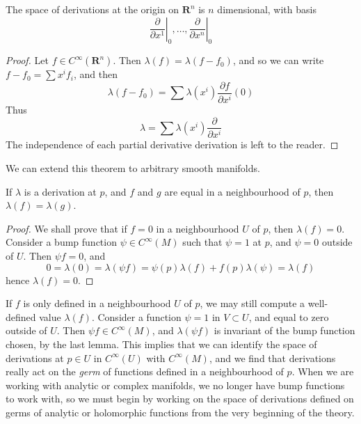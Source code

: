 \begin{theorem}
    The space of derivations at the origin on $\mathbf{R}^n$ is $n$ dimensional, with basis
    \[ \left.\frac{\partial}{\partial x^1}\right|_0, \dots, \left.\frac{\partial}{\partial x^n}\right|_0 \]
\end{theorem}
\begin{proof}
    Let $f \in C^\infty(\mathbf{R}^n)$. Then $\lambda(f) = \lambda(f - f_0)$, and so we can write $f - f_0 = \sum x^i f_i$, and then
    \[ \lambda(f - f_0) = \sum \lambda(x^i) \frac{\partial f}{\partial x^i}(0) \]
    Thus
    \[ \lambda = \sum \lambda(x^i) \frac{\partial}{\partial x^i} \]
    The independence of each partial derivative derivation is left to the reader.
\end{proof}

We can extend this theorem to arbitrary smooth manifolds.

\begin{lemma}
    If $\lambda$ is a derivation at $p$, and $f$ and $g$ are equal in a neighbourhood of $p$, then $\lambda(f) = \lambda(g)$.
\end{lemma}
\begin{proof}
    We shall prove that if $f = 0$ in a neighbourhood $U$ of $p$, then $\lambda(f) = 0$. Consider a bump function $\psi \in C^\infty(M)$ such that $\psi = 1$ at $p$, and $\psi = 0$ outside of $U$. Then $\psi f = 0$, and
    \[ 0 = \lambda(0) = \lambda(\psi f) = \psi(p) \lambda(f) + f(p) \lambda(\psi) = \lambda(f) \]
    hence $\lambda(f) = 0$.
\end{proof}

If $f$ is only defined in a neighbourhood $U$ of $p$, we may still compute a well-defined value $\lambda(f)$. Consider a function $\psi = 1$ in $V \subset U$, and equal to zero outside of $U$. Then $\psi f \in C^\infty(M)$, and $\lambda(\psi f)$ is invariant of the bump function chosen, by the last lemma. This implies that we can identify the space of derivations at $p \in U$ in $C^\infty(U)$ with $C^\infty(M)$, and we find that derivations really act on the \emph{germ} of functions defined in a neighbourhood of $p$. When we are working with analytic or complex manifolds, we no longer have bump functions to work with, so we must begin by working on the space of derivations defined on germs of analytic or holomorphic functions from the very beginning of the theory.

